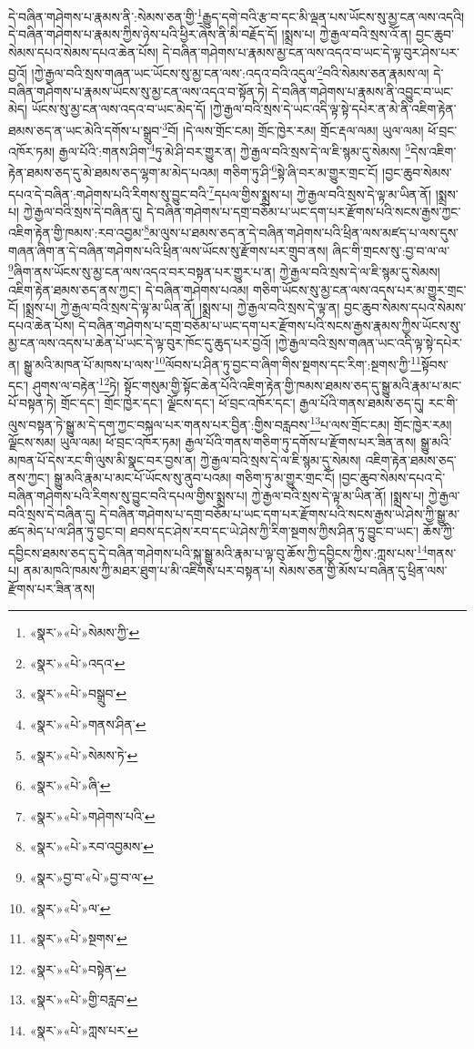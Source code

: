 དེ་བཞིན་གཤེགས་པ་རྣམས་ནི་:སེམས་ཅན་གྱི་\footnote{«སྣར་»«པེ་»སེམས་ཀྱི་}རྒྱུད་དགེ་བའི་རྩ་བ་དང་མི་ལྡན་པས་ཡོངས་སུ་མྱ་ངན་ལས་འདའི། དེ་བཞིན་གཤེགས་པ་རྣམས་ཀྱིས་ཉེས་པའི་ཕྱིར་ཞེས་ནི་མི་བརྗོད་དོ། །སྨྲས་པ། ཀྱེ་རྒྱལ་བའི་སྲས་འོ་ན། བྱང་ཆུབ་སེམས་དཔའ་སེམས་དཔའ་ཆེན་པོས། དེ་བཞིན་གཤེགས་པ་རྣམས་མྱ་ངན་ལས་འདའ་བ་ཡང་དེ་ལྟ་བུར་ཤེས་པར་བྱའོ། །ཀྱེ་རྒྱལ་བའི་སྲས་གཞན་ཡང་ཡོངས་སུ་མྱ་ངན་ལས་:འདའ་བའི་འདུལ་\footnote{«སྣར་»«པེ་»འདའ་}བའི་སེམས་ཅན་རྣམས་ལ། དེ་བཞིན་གཤེགས་པ་རྣམས་ཡོངས་སུ་མྱ་ངན་ལས་འདའ་བ་སྟོན་ཏེ། དེ་བཞིན་གཤེགས་པ་རྣམས་ནི་འབྱུང་བ་ཡང་མེད། ཡོངས་སུ་མྱ་ངན་ལས་འདའ་བ་ཡང་མེད་དོ། །ཀྱེ་རྒྱལ་བའི་སྲས་དེ་ཡང་འདི་ལྟ་སྟེ་དཔེར་ན་མེ་ནི་འཇིག་རྟེན་ཐམས་ཅད་ན་ཡང་མེའི་དགོས་པ་སྒྲུབ་\footnote{«སྣར་»«པེ་»བསྒྲུབ་}བོ། །དེ་ལས་གྲོང་ངམ། གྲོང་ཁྱེར་རམ། གྲོང་རྡལ་ལམ། ཡུལ་ལམ། ཕོ་བྲང་འཁོར་ཏམ། རྒྱལ་པོའི་:གནས་ཤིག་\footnote{«སྣར་»«པེ་»གནས་ཤིན་}ཏུ་མེ་ཤི་བར་གྱུར་ན། ཀྱེ་རྒྱལ་བའི་སྲས་དེ་ལ་ཇི་སྙམ་དུ་སེམས། \footnote{«སྣར་»«པེ་»སེམས་ཏེ་}དེས་འཇིག་རྟེན་ཐམས་ཅད་དུ་མེ་ཐམས་ཅད་ལྷག་མ་མེད་པའམ། གཅིག་ཏུ་ཤི་\footnote{«སྣར་»«པེ་»ཞི་}སྟེ་ཞི་བར་མ་གྱུར་གྲང་ངོ། །བྱང་ཆུབ་སེམས་དཔའ་དེ་བཞིན་:གཤེགས་པའི་རིགས་སུ་བྱུང་བའི་\footnote{«སྣར་»«པེ་»གཤེགས་པའི་}དཔལ་གྱིས་སྨྲས་པ། ཀྱེ་རྒྱལ་བའི་སྲས་དེ་ལྟ་མ་ཡིན་ནོ། །སྨྲས་པ། ཀྱེ་རྒྱལ་བའི་སྲས་དེ་བཞིན་དུ། དེ་བཞིན་གཤེགས་པ་དགྲ་བཅོམ་པ་ཡང་དག་པར་རྫོགས་པའི་སངས་རྒྱས་ཀྱང་འཇིག་རྟེན་གྱི་ཁམས་:རབ་འབྱམ་\footnote{«སྣར་»«པེ་»རབ་འབྱམས་}མ་ལུས་པ་ཐམས་ཅད་ན་དེ་བཞིན་གཤེགས་པའི་ཕྲིན་ལས་མཛད་པ་ལས་དུས་གཞན་ཞིག་ན་དེ་བཞིན་གཤེགས་པའི་ཕྲིན་ལས་ཡོངས་སུ་རྫོགས་པར་གྲུབ་ནས། ཞིང་གི་གྲངས་སུ་:བྱ་བ་ལ་ལ་\footnote{«སྣར་»བྱ་བ་«པེ་»བྱ་བ་ལ་}ཞིག་ནས་ཡོངས་སུ་མྱ་ངན་ལས་འདའ་བར་བསྟན་པར་གྱུར་པ་ན། ཀྱེ་རྒྱལ་བའི་སྲས་དེ་ལ་ཇི་སྙམ་དུ་སེམས། འཇིག་རྟེན་ཐམས་ཅད་ནས་ཀྱང་། དེ་བཞིན་གཤེགས་པའམ། གཅིག་ཡོངས་སུ་མྱ་ངན་ལས་འདས་པར་མ་གྱུར་གྲང་ངོ། །སྨྲས་པ། ཀྱེ་རྒྱལ་བའི་སྲས་དེ་ལྟ་མ་ཡིན་ནོ། །སྨྲས་པ། ཀྱེ་རྒྱལ་བའི་སྲས་དེ་ལྟ་ན། བྱང་ཆུབ་སེམས་དཔའ་སེམས་དཔའ་ཆེན་པོས། དེ་བཞིན་གཤེགས་པ་དགྲ་བཅོམ་པ་ཡང་དག་པར་རྫོགས་པའི་སངས་རྒྱས་རྣམས་ཀྱིས་ཡོངས་སུ་མྱ་ངན་ལས་འདས་པ་ཆེན་པོ་ཡང་དེ་ལྟ་བུར་ཁོང་དུ་ཆུད་པར་བྱའོ། །ཀྱེ་རྒྱལ་བའི་སྲས་གཞན་ཡང་འདི་ལྟ་སྟེ་དཔེར་ན། སྒྱུ་མའི་མཁན་པོ་མཁས་པ་ལས་\footnote{«སྣར་»«པེ་»ལ་}ལོབས་པ་ཤིན་ཏུ་བྱང་བ་ཞིག་གིས་སྔགས་དང་རིག་:སྔགས་ཀྱི་\footnote{«སྣར་»«པེ་»སྔགས་}སྟོབས་དང་། ཤུགས་ལ་བརྟེན་\footnote{«སྣར་»«པེ་»བསྟེན་}ཏེ། སྟོང་གསུམ་གྱི་སྟོང་ཆེན་པོའི་འཇིག་རྟེན་གྱི་ཁམས་ཐམས་ཅད་དུ་སྒྱུ་མའི་རྣམ་པ་མང་པོ་བསྟན་ཏེ། གྲོང་དང་། གྲོང་ཁྱེར་དང་། ལྗོངས་དང་། ཕོ་བྲང་འཁོར་དང་། རྒྱལ་པོའི་གནས་ཐམས་ཅད་དུ། རང་གི་ལུས་བསྟན་ཏེ་སྒྱུ་མ་དེ་དག་ཀྱང་བསྐལ་པར་གནས་པར་བྱིན་:གྱིས་བརླབས་\footnote{«སྣར་»«པེ་»གྱི་བརླབ་}པ་ལས་གྲོང་ངམ། གྲོང་ཁྱེར་རམ། ལྗོངས་སམ། ཡུལ་ལམ། ཕོ་བྲང་འཁོར་ཏམ། རྒྱལ་པོའི་གནས་གཅིག་ཏུ་དགོས་པ་རྫོགས་པར་ཟིན་ནས། སྒྱུ་མའི་མཁན་པོ་དེས་རང་གི་ལུས་མི་སྣང་བར་བྱས་ན། ཀྱེ་རྒྱལ་བའི་སྲས་དེ་ལ་ཇི་སྙམ་དུ་སེམས། འཇིག་རྟེན་ཐམས་ཅད་ནས་ཀྱང་། སྒྱུ་མའི་རྣམ་པ་མང་པོ་ཡོངས་སུ་ནུབ་པའམ། གཅིག་ཏུ་མ་གྱུར་གྲང་ངོ། །བྱང་ཆུབ་སེམས་དཔའ་དེ་བཞིན་གཤེགས་པའི་རིགས་སུ་བྱུང་བའི་དཔལ་གྱིས་སྨྲས་པ། ཀྱེ་རྒྱལ་བའི་སྲས་དེ་ལྟ་མ་ཡིན་ནོ། །སྨྲས་པ། ཀྱེ་རྒྱལ་བའི་སྲས་དེ་བཞིན་དུ། དེ་བཞིན་གཤེགས་པ་དགྲ་བཅོམ་པ་ཡང་དག་པར་རྫོགས་པའི་སངས་རྒྱས་ཡེ་ཤེས་ཀྱི་སྒྱུ་མ་ཚད་མེད་པ་ལ་ཤིན་ཏུ་བྱང་བ། ཐབས་དང་ཤེས་རབ་དང་ཡེ་ཤེས་ཀྱི་རིག་སྔགས་ཀྱིས་ཤིན་ཏུ་བྱུང་བ་ཡང་། ཆོས་ཀྱི་དབྱིངས་ཐམས་ཅད་དུ་དེ་བཞིན་གཤེགས་པའི་སྐུ་སྒྱུ་མའི་རྣམ་པ་ལྟ་བུ་ཆོས་ཀྱི་དབྱིངས་ཀྱིས་:ཀླས་པས་\footnote{«སྣར་»«པེ་»ཀླས་པར་}གནས་པ། ནམ་མཁའི་ཁམས་ཀྱི་མཐར་ཐུག་པ་མི་འཇིགས་པར་བསྟན་པ། སེམས་ཅན་གྱི་མོས་པ་བཞིན་དུ་ཕྲིན་ལས་རྫོགས་པར་ཟིན་ནས། 